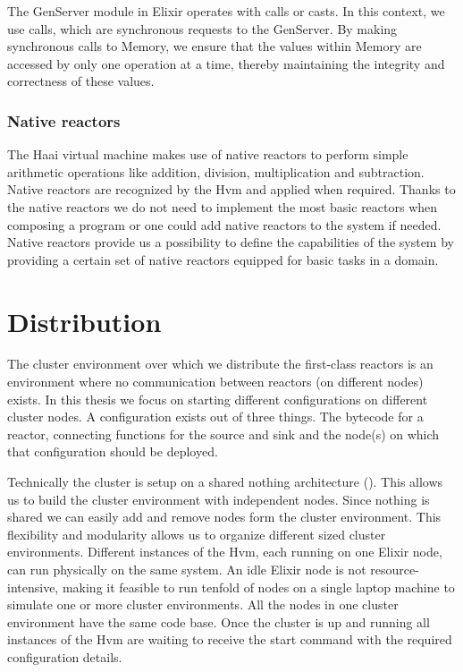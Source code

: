 \documentclass[a4paper]{book}
\begin{document}
The GenServer module in Elixir operates with calls or casts. In this context, we use calls, which are synchronous requests to the GenServer. By making synchronous calls to Memory, we ensure that the values within Memory are accessed by only one operation at a time, thereby maintaining the integrity and correctness of these values.

\subsection{Native reactors}
The Haai virtual machine makes use of native reactors to perform simple arithmetic operations like addition, division, multiplication and subtraction. Native reactors are recognized by the Hvm and applied when required. Thanks to the native reactors we do not need to implement the most basic reactors when composing a program or one could add native reactors to the system if needed. Native reactors provide us a possibility to define the capabilities of the system by providing a certain set of native reactors equipped for basic tasks in a domain.

\chapter{Distribution} \label{sec:distribution}
The cluster environment over which we distribute the first-class reactors is an environment where no communication between reactors (on different nodes) exists. In this thesis we focus on starting  different configurations on different cluster nodes. A configuration exists out of three things. The bytecode for a reactor, connecting functions for the source and sink and the node(s) on which that configuration should be deployed. 

Technically the cluster is setup on a shared nothing architecture (\cite{DBLP:journals/debu/Stonebraker86}). This allows us to build the cluster environment with independent nodes. Since nothing is shared we can easily add and remove nodes form the cluster environment. This flexibility and modularity allows us to organize different sized cluster environments. Different instances of the Hvm, each running on one Elixir node, can run physically on the same system. An idle Elixir node is not resource-intensive, making it feasible to run tenfold of nodes on a single laptop machine to simulate one or more cluster environments. All the nodes in one cluster environment have the same code base. Once the cluster is up and running all instances of the Hvm are waiting to receive the start command with the required configuration details.
\end{document}
